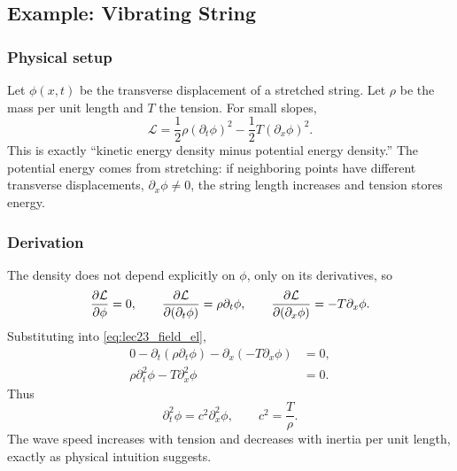 \documentclass[../main.tex]{subfiles}
\begin{document}
\subsection{Example: Vibrating String}

\subsubsection*{Physical setup}
Let $\phi(x,t)$ be the transverse displacement of a stretched string.  Let
$\rho$ be the mass per unit length and $T$ the tension.  For small slopes,
\begin{equation}
  \mathcal L=\frac12\rho(\partial_t\phi)^2-\frac12T(\partial_x\phi)^2 .
  \label{eq:lec23_string_lagrangian}
\end{equation}
This is exactly ``kinetic energy density minus potential energy density.''  The
potential energy comes from stretching: if neighboring points have different
transverse displacements, $\partial_x\phi\ne0$, the string length increases and
tension stores energy.

\subsubsection*{Derivation}
The density does not depend explicitly on $\phi$, only on its derivatives, so
\begin{equation}
  \pdv{\mathcal L}{\phi}=0,
  \qquad
  \pdv{\mathcal L}{(\partial_t\phi)}=\rho\partial_t\phi,
  \qquad
  \pdv{\mathcal L}{(\partial_x\phi)}=-T\partial_x\phi .
\end{equation}
Substituting into \eqref{eq:lec23_field_el},
\begin{align}
  0-\partial_t(\rho\partial_t\phi)-\partial_x(-T\partial_x\phi)&=0,\\
  \rho\partial_t^2\phi-T\partial_x^2\phi&=0.
\end{align}
Thus
\begin{equation}
  \boxed{\partial_t^2\phi=c^2\partial_x^2\phi,
  \qquad c^2=\frac{T}{\rho}.}
  \label{eq:lec23_string_wave}
\end{equation}
The wave speed increases with tension and decreases with inertia per unit
length, exactly as physical intuition suggests.
\end{document}
